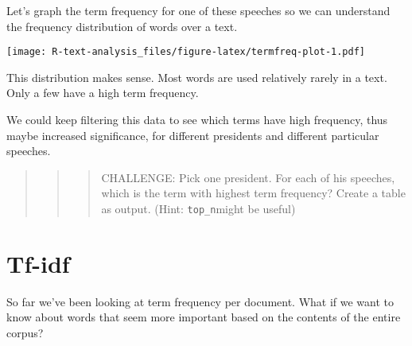 \documentclass[]{book}
\newenvironment{Shaded}{\begin{snugshade}}{\end{snugshade}}
\newcommand{\CommentTok}[1]{\textcolor[rgb]{0.56,0.35,0.01}{\textit{#1}}}
\newcommand{\DataTypeTok}[1]{\textcolor[rgb]{0.13,0.29,0.53}{#1}}
\newcommand{\KeywordTok}[1]{\textcolor[rgb]{0.13,0.29,0.53}{\textbf{#1}}}
\newcommand{\NormalTok}[1]{#1}
\newcommand{\OperatorTok}[1]{\textcolor[rgb]{0.81,0.36,0.00}{\textbf{#1}}}
\newcommand{\StringTok}[1]{\textcolor[rgb]{0.31,0.60,0.02}{#1}}
\begin{document}
Let's graph the term frequency for one of these speeches so we can understand the frequency distribution of words over a text.

\begin{Shaded}
\end{Shaded}

\texttt{[image: R-text-analysis\_files/figure-latex/termfreq-plot-1.pdf]}

This distribution makes sense. Most words are used relatively rarely in a text. Only a few have a high term frequency.

We could keep filtering this data to see which terms have high frequency, thus maybe increased significance, for different presidents and different particular speeches.

\begin{quote}
\begin{quote}
\begin{quote}
CHALLENGE: Pick one president. For each of his speeches, which is the term with highest term frequency? Create a table as output. (Hint: \texttt{top\_n}might be useful)
\end{quote}
\end{quote}
\end{quote}

\hypertarget{tf-idf}{%
\section{Tf-idf}\label{tf-idf}}

So far we've been looking at term frequency per document. What if we want to know about words that seem more important based on the contents of the entire corpus?
\end{document}
